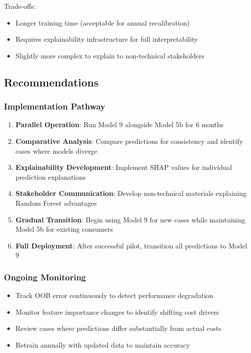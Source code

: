 Trade-offs:
\begin{itemize}
    \item Longer training time (acceptable for annual recalibration)
    \item Requires explainability infrastructure for full interpretability
    \item Slightly more complex to explain to non-technical stakeholders
\end{itemize}

\subsection{Recommendations}

\subsubsection{Implementation Pathway}

\begin{enumerate}
    \item \textbf{Parallel Operation}: Run Model 9 alongside Model 5b for 6 months
    \item \textbf{Comparative Analysis}: Compare predictions for consistency and identify cases where models diverge
    \item \textbf{Explainability Development}: Implement SHAP values for individual prediction explanations
    \item \textbf{Stakeholder Communication}: Develop non-technical materials explaining Random Forest advantages
    \item \textbf{Gradual Transition}: Begin using Model 9 for new cases while maintaining Model 5b for existing consumers
    \item \textbf{Full Deployment}: After successful pilot, transition all predictions to Model 9
\end{enumerate}

\subsubsection{Ongoing Monitoring}

\begin{itemize}
    \item Track OOB error continuously to detect performance degradation
    \item Monitor feature importance changes to identify shifting cost drivers
    \item Review cases where predictions differ substantially from actual costs
    \item Retrain annually with updated data to maintain accuracy
\end{itemize}

